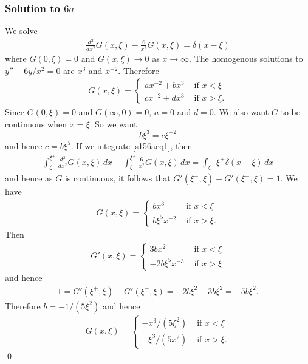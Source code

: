 \subsubsection*{Solution to $6a$}
We solve
\begin{align}\label{s156aeq1}
\frac{d^{2}}{dx^{2}}G(x, \xi) - \frac{6}{x^{2}}G(x, \xi) = \delta(x - \xi)
\end{align}
where $G(0, \xi) = 0$ and $G(x, \xi) \rightarrow 0$ as $x \rightarrow \infty$.
The homogenous solutions to $y'' - 6y/x^{2} = 0$ are $x^{3}$ and $x^{-2}$. Therefore
\begin{align*}
G(x, \xi) =
\begin{cases}
ax^{-2} + bx^{3} & \text{ if } x < \xi\\
cx^{-2} + dx^{3} & \text{ if } x > \xi.
\end{cases}
\end{align*}
Since $G(0, \xi) = 0$ and $G(\infty, 0) = 0$, $a = 0$ and $d = 0$.
We also want $G$ to be continuous when $x = \xi$. So we want
$$b \xi^{3} = c\xi^{-2}$$
and hence $c = b\xi^{5}$. If we integrate \eqref{s156aeq1}, then
\begin{align*}
\int_{\xi^{-}}^{\xi^{+}}\frac{d^{2}}{dx^{2}}G(x, \xi)\, dx - \int_{\xi^{-}}^{\xi^{+}}\frac{6}{x^{2}}G(x, \xi)\, dx = \int_{\xi^{-}}{\xi^{+}}\delta(x - \xi)\, dx
\end{align*}
and hence as $G$ is continuous, it follows that $G'(\xi^{+}, \xi) - G'(\xi^{-}, \xi) = 1$. We have
\begin{align*}
G(x, \xi) =
\begin{cases}
bx^{3} & \text{ if } x < \xi\\
b\xi^{5}x^{-2} & \text{ if } x > \xi.
\end{cases}
\end{align*}
Then
\begin{align*}
G'(x, \xi) =
\begin{cases}
3bx^{2} & \text{ if } x < \xi\\
-2b\xi^{5}x^{-3} & \text{ if } x > \xi
\end{cases}
\end{align*}
and hence
\begin{align*}
1 = G'(\xi^{+}, \xi) - G'(\xi^{-}, \xi) = -2b\xi^{2} - 3b\xi^{2} = -5b\xi^{2}.
\end{align*}
Therefore $b = -1/(5\xi^{2})$ and hence
\begin{align*}
G(x, \xi) =
\begin{cases}
-x^{3}/(5\xi^{2}) & \text{ if } x < \xi\\
-\xi^{3}/(5x^{2}) & \text{ if } x > \xi.
\end{cases}
\end{align*}
\hfill\qed

